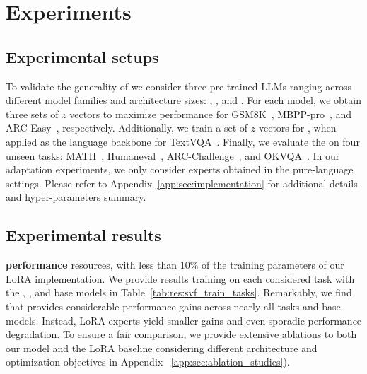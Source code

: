 \section{Experiments}
\label{sec:experiments}
\vspace{-2mm}

\subsection{Experimental setups}
\vspace{-1mm}

To validate the generality of \implname we consider three pre-trained LLMs ranging across different model families and architecture sizes: \llama, \mistral, and \llamaXL. 
For each model, we obtain three sets of $z$ vectors to maximize performance for GSM8K~\citep{cobbe2021training},  MBPP-pro~\citep{austin2021program}, and ARC-Easy~\citep{clark2018think}, respectively.
Additionally, we train a set of $z$ vectors for \llama, when applied as the language backbone for TextVQA~\citep{singh2019towards}.
Finally, we evaluate the \implname on four unseen tasks: MATH~\citep{hendrycks2021measuring}, Humaneval~\citep{chen2021evaluating}, ARC-Challenge~\citep{clark2018think}, and OKVQA~\citep{marino2019ok}. 
In our adaptation experiments, we only consider experts obtained in the pure-language settings.
Please refer to Appendix~\ref{app:sec:implementation} for additional details and hyper-parameters summary.

\vspace{-2mm}
\subsection{Experimental results}




\textbf{\svdacro performance}
resources, with less than 10\% of the training parameters of our LoRA implementation.
We provide results training on each considered task with the \llama, \mistral, and \llamaXL base models in Table~\ref{tab:res:svf_train_tasks}.
Remarkably, we find that \svdacro provides considerable performance gains across nearly all tasks and base models. Instead, LoRA experts yield smaller gains and even sporadic performance degradation.
To ensure a fair comparison, we provide extensive ablations to both our model and the LoRA baseline considering different architecture and optimization objectives in Appendix~ \ref{app:sec:ablation_studies}).


